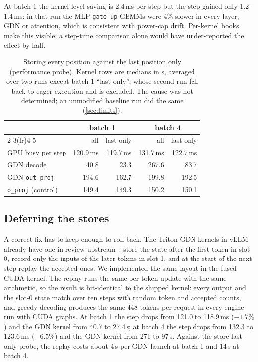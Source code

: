 At batch 1 the kernel-level saving is 2.4\,ms per step but the step gained only 1.2--1.4\,ms: in
that run the MLP \texttt{gate\_up} GEMMs were 4\% slower in every layer, GDN or attention, which
is consistent with power-cap drift. Per-kernel books make this visible; a step-time comparison
alone would have under-reported the effect by half.

\begin{table}[t]
\centering\small
\begin{tabular}{@{}lrrrr@{}}
\toprule
 & \multicolumn{2}{c}{batch 1} & \multicolumn{2}{c}{batch 4} \\
\cmidrule(lr){2-3}\cmidrule(lr){4-5}
 & all & last only & all & last only \\
\midrule
GPU busy per step & 120.9\,ms & 119.7\,ms & 131.7\,ms & 122.7\,ms \\
GDN decode & 40.8 & 23.3 & 267.6 & 83.7 \\
GDN \texttt{out\_proj} & 194.6 & 162.7 & 199.8 & 192.5 \\
\texttt{o\_proj} (control) & 149.4 & 149.3 & 150.2 & 150.1 \\
\bottomrule
\end{tabular}
\caption{Storing every position against the last position only (performance probe). Kernel rows are medians in \textmu s, averaged over two runs except batch 1 ``last only'', whose second run fell back to eager execution and is excluded. The cause was not determined; an unmodified baseline run did the same (\cref{sec:limits}).}\label{tab:probe}
\end{table}

\subsection{Deferring the stores}

A correct fix has to keep enough to roll back. The Triton GDN kernels in vLLM already have one in
review upstream~\cite{vllmpr61434}: store the state after the first token in slot 0, record only the
inputs of the later tokens in slot 1, and at the start of the next step replay the accepted ones.
We implemented the same layout in the fused CUDA kernel. The replay runs the same per-token update
with the same arithmetic, so the result is bit-identical to the shipped kernel: every output and
the slot-0 state match over ten steps with random token and accepted counts, and greedy decoding
produces the same 448 tokens per request in every engine run with CUDA graphs. At batch 1 the step drops from
121.0 to 118.9\,ms ($-1.7\%$) and the GDN kernel from 40.7 to 27.4\,\textmu s; at batch 4 the step
drops from 132.3 to 123.6\,ms ($-6.5\%$) and the GDN kernel from 271 to 97\,\textmu s. Against the store-last-only probe, the replay
costs about 4\,\textmu s per GDN launch at batch 1 and 14\,\textmu s at batch 4.

